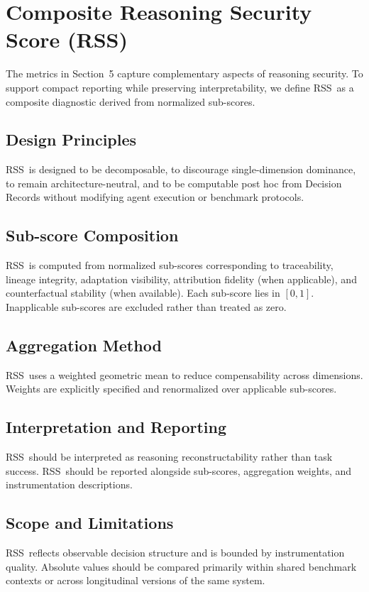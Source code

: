 \documentclass[11pt]{article}
\newcommand{\RSS}{\textsc{RSS}}
\begin{document}
\section{Composite Reasoning Security Score (RSS)}
The metrics in Section~5 capture complementary aspects of reasoning security. To support compact reporting while preserving interpretability, we define \RSS\ as a composite diagnostic derived from normalized sub-scores.

\subsection{Design Principles}
\RSS\ is designed to be decomposable, to discourage single-dimension dominance, to remain architecture-neutral, and to be computable post hoc from Decision Records without modifying agent execution or benchmark protocols.

\subsection{Sub-score Composition}
\RSS\ is computed from normalized sub-scores corresponding to traceability, lineage integrity, adaptation visibility, attribution fidelity (when applicable), and counterfactual stability (when available). Each sub-score lies in $[0,1]$. Inapplicable sub-scores are excluded rather than treated as zero.

\subsection{Aggregation Method}
\RSS\ uses a weighted geometric mean to reduce compensability across dimensions. Weights are explicitly specified and renormalized over applicable sub-scores.

\subsection{Interpretation and Reporting}
\RSS\ should be interpreted as reasoning reconstructability rather than task success. \RSS\ should be reported alongside sub-scores, aggregation weights, and instrumentation descriptions.

\subsection{Scope and Limitations}
\RSS\ reflects observable decision structure and is bounded by instrumentation quality. Absolute values should be compared primarily within shared benchmark contexts or across longitudinal versions of the same system.
\end{document}
